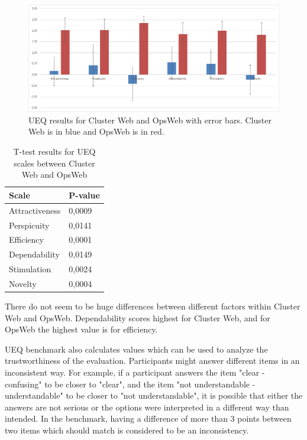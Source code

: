 \begin{figure}[ht]
  \begin{center}
    \includegraphics*[width=1\textwidth]{ueq_error_bars}
  \end{center}
  \caption{UEQ results for Cluster Web and OpsWeb with error bars. Cluster Web is in blue and OpsWeb is in red.}
  \label{fig:ueq_error_bars}
\end{figure}

\begin{table}[!ht]
\def\arraystretch{1.1}%
    \begin{center}
    \caption{T-test results for UEQ scales between Cluster Web and OpsWeb}
    \label{table:ueq_t_test}
    \begin{tabular}{| l | l | }
    \hline
    Scale & P-value  \\
    \hline
Attractiveness & 0,0009  \\
Perspicuity    & 0,0141 \\
Efficiency     & 0,0001 \\
Dependability  & 0,0149 \\
Stimulation    & 0,0024 \\
Novelty        & 0,0004 \\
    \hline
    \end{tabular}
    \end{center}
\end{table}


There do not seem to be huge differences between different factors within Cluster Web and OpsWeb. Dependability scores highest for Cluster Web, and for OpsWeb the highest value is for efficiency.

UEQ benchmark also calculates values which can be used to analyze the trustworthiness of the evaluation. Participants might answer different items in an inconsistent way. For example, if a participant answers the item "clear - confusing" to be closer to "clear", and the item "not understandable - understandable" to be closer to "not understandable", it is possible that either the answers are not serious or the options were interpreted in a different way than intended. In the benchmark, having a difference of more than 3 points between two items which should match is considered to be an inconsistency.

